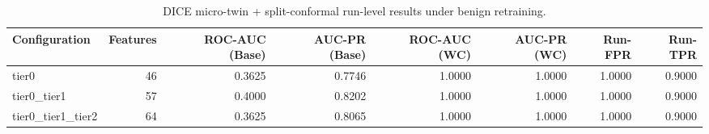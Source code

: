 \begin{table}[t]
\centering
\caption{DICE micro-twin + split-conformal run-level results under benign retraining.}
\label{tab:dice_full_overall}
\footnotesize
\begin{tabular}{lrrrrrrr}
\toprule
Configuration & Features & ROC-AUC (Base) & AUC-PR (Base) & ROC-AUC (WC) & AUC-PR (WC) & Run-FPR & Run-TPR \\
\midrule
tier0 & 46 & 0.3625 & 0.7746 & 1.0000 & 1.0000 & 1.0000 & 0.9000 \\
tier0_tier1 & 57 & 0.4000 & 0.8202 & 1.0000 & 1.0000 & 1.0000 & 0.9000 \\
tier0_tier1_tier2 & 64 & 0.3625 & 0.8065 & 1.0000 & 1.0000 & 1.0000 & 0.9000 \\
\bottomrule
\end{tabular}

\end{table}
